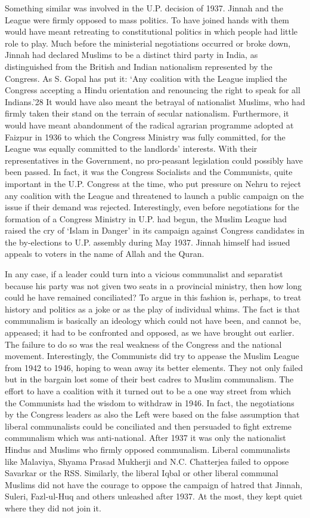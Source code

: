 Something similar was involved in the U.P. decision of 1937. Jinnah and the League were firmly opposed to mass politics. To have joined hands with them would have meant retreating to constitutional politics in which people had little role to play. Much before the ministerial negotiations occurred or broke down, Jinnah had declared Muslims to be a distinct third party in India, as distinguished from the British and Indian nationalism represented by the Congress. As S. Gopal has put it: `Any coalition with the League implied the Congress accepting a Hindu orientation and renouncing the right to speak for all Indians.'28 It would have also meant the betrayal of nationalist Muslims, who had firmly taken their stand on the terrain of secular nationalism. Furthermore, it would have meant abandonment of the radical agrarian programme adopted at Faizpur in 1936 to which the Congress Ministry was fully committed, for the League was equally committed to the landlords' interests. With their representatives in the Government, no pro-peasant legislation could possibly have been passed. In fact, it was the Congress Socialists and the Communists, quite important in the U.P. Congress at the time, who put pressure on Nehru to reject any coalition with the League and threatened to launch a public campaign on the issue if their demand was rejected. Interestingly, even before negotiations for the formation of a Congress Ministry in U.P. had begun, the Muslim League had raised the cry of `Islam in Danger' in its campaign against Congress candidates in the by-elections to U.P. assembly during May 1937. Jinnah himself had issued appeals to voters in the name of Allah and the Quran. 

In any case, if a leader could turn into a vicious communalist and separatist because his party was not given two seats in a provincial ministry, then how long could he have remained conciliated? To argue in this fashion is, perhaps, to treat history and politics as a joke or as the play of individual whims. The fact is that communalism is basically an ideology which could not have been, and cannot be, appeased; it had to be confronted and opposed, as we have brought out earlier. The failure to do so was the real weakness of the Congress and the national movement. Interestingly, the Communists did try to appease the Muslim League from 1942 to 1946, hoping to wean away its better elements. They not only failed but in the bargain lost some of their best cadres to Muslim communalism. The effort to have a coalition with it turned out to be a one way street from which the Communists had the wisdom to withdraw in 1946. In fact, the negotiations by the Congress leaders as also the Left were based on the false assumption that liberal communalists could be conciliated and then persuaded to fight extreme communalism which was anti-national. After 1937 it was only the nationalist Hindus and Muslims who firmly opposed communalism. Liberal communalists like Malaviya, Shyama Prasad Mukherji and N.C. Chatterjea failed to oppose Savarkar or the RSS. Similarly, the liberal Iqbal or other liberal communal Muslims did not have the courage to oppose the campaign of hatred that Jinnah, Suleri, Fazl-ul-Huq and others unleashed after 1937. At the most, they kept quiet where they did not join it. 

